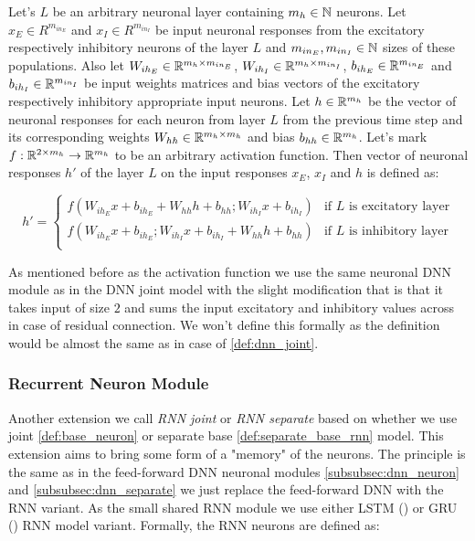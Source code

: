 \begin{defn}
    Let's $L$ be an arbitrary neuronal layer containing $m_h \in \mathbb{N}$ neurons. Let $x_E \in R^{m_{in_E}}$ and $x_I \in R^{m_{in_I}}$ be input neuronal responses from the excitatory respectively inhibitory neurons of the layer $L$ and $m_{in_E}, m_{in_I} \in \mathbb{N}$ sizes of these populations. Also let $W_{ih_E} \in \mathbb{R}^{m_h \times m_{in_E}}$, $W_{ih_I} \in \mathbb{R}^{m_h \times m_{in_I}}$, $b_{ih_E} \in \mathbb{R}^{m_{in_E}}$ and $b_{ih_I} \in \mathbb{R}^{m_{in_I}}$ be input weights matrices and bias vectors of the excitatory respectively inhibitory appropriate input neurons. Let $h \in \mathbb{R}^{m_h}$ be the vector of neuronal responses for each neuron from layer $L$ from the previous time step and its corresponding weights $W_{hh} \in \mathbb{R}^{m_h \times m_h}$ and bias $b_{hh} \in \mathbb{R}^{m_h}$. Let's mark $f: \mathbb{R}^{2 \times m_h} \to \mathbb{R}^{m_h}$ to be an arbitrary activation function. Then vector of neuronal responses $h'$ of the layer $L$ on the input responses $x_E$, $x_I$ and $h$ is defined as:

    \begin{equation*}
        h' = 
        \begin{cases}
            f\left(W_{ih_E}x + b_{ih_E} + W_{hh}h + b_{hh}; W_{ih_I}x + b_{ih_I}\right) & \text{if $L$ is excitatory layer}\\
            f\left(W_{ih_E}x + b_{ih_E}; W_{ih_I}x + b_{ih_I} + W_{hh}h + b_{hh}\right) & \text{if $L$ is inhibitory layer}\\
        \end{cases}      
    \end{equation*}
\end{defn}
\label{def:separate_base_rnn}

As mentioned before as the activation function we use the same neuronal DNN module as in the DNN joint model with the slight modification that is that it takes input of size $2$ and sums the input excitatory and inhibitory values across in case of residual connection. We won't define this formally as the definition would be almost the same as in case of \ref{def:dnn_joint}.

\subsubsection{Recurrent Neuron Module}
\label{subsubsec:rnn_neuron_module}
Another extension we call \emph{RNN joint} or \emph{RNN separate} based on whether we use joint \ref{def:base_neuron} or separate base \ref{def:separate_base_rnn} model. This extension aims to bring some form of a "memory" of the neurons. The principle is the same as in the feed-forward DNN neuronal modules \ref{subsubsec:dnn_neuron} and \ref{subsubsec:dnn_separate} we just replace the feed-forward DNN with the RNN variant. As the small shared RNN module we use either LSTM (\citet{hochreiter1997lstm}) or GRU (\citet{cho2014gru}) RNN model variant. Formally, the RNN neurons are defined as:

